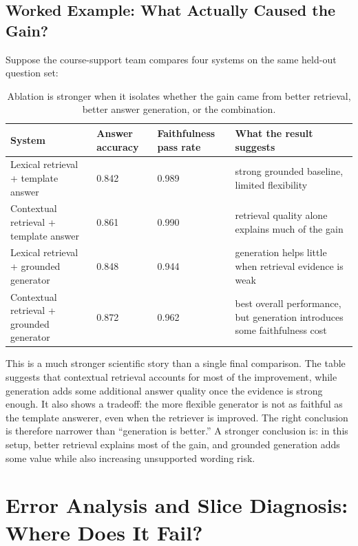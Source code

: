 \subsection{Worked Example: What Actually Caused the Gain?}

Suppose the course-support team compares four systems on the same held-out question set:

\begin{table}[t]
\centering
\small
\setlength{\tabcolsep}{4pt}
\begin{tabular}{p{3.33cm}p{1.58cm}p{1.96cm}p{2.79cm}}
\toprule
System & Answer accuracy & Faithfulness pass rate & What the result suggests \\
\midrule
Lexical retrieval + template answer & 0.842 & 0.989 & strong grounded baseline, limited flexibility \\
Contextual retrieval + template answer & 0.861 & 0.990 & retrieval quality alone explains much of the gain \\
Lexical retrieval + grounded generator & 0.848 & 0.944 & generation helps little when retrieval evidence is weak \\
Contextual retrieval + grounded generator & 0.872 & 0.962 & best overall performance, but generation introduces some faithfulness cost \\
\bottomrule
\end{tabular}
\caption{Ablation is stronger when it isolates whether the gain came from better retrieval, better answer generation, or the combination.}
\label{tab:support-assistant-ablation}
\end{table}

This is a much stronger scientific story than a single final comparison. The table suggests that contextual retrieval accounts for most of the improvement, while generation adds some additional answer quality once the evidence is strong enough. It also shows a tradeoff: the more flexible generator is not as faithful as the template answerer, even when the retriever is improved. The right conclusion is therefore narrower than ``generation is better.'' A stronger conclusion is: in this setup, better retrieval explains most of the gain, and grounded generation adds some value while also increasing unsupported wording risk.

\section{Error Analysis and Slice Diagnosis: Where Does It Fail?}

